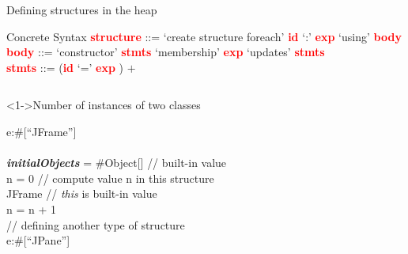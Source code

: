 \documentclass[10pt,xcolor={dvipsnames}]{beamer}
\begin{document}
	\begin{frame}{Defining structures in the heap}
		\begin{block}{Concrete Syntax}
			\hspace{1cm} \textcolor{red}{\textbf{structure}} ::= `\textcolor{Emerald}{create structure foreach}' \textcolor{red}{\textbf{id}} `\textcolor{Emerald}{:}' \textcolor{red}{\textbf{exp}} `\textcolor{Emerald}{using}' \textcolor{red}{\textbf{body}} \\ 
			\hspace{1cm} \textcolor{red}{\textbf{body}} ::= `\textcolor{Emerald}{constructor}' \textcolor{red}{\textbf{stmts}} `\textcolor{Emerald}{membership}' \textcolor{red}{\textbf{exp}} `\textcolor{Emerald}{updates}' \textcolor{red}{\textbf{stmts}} \\
			\hspace{1cm} \textcolor{red}{\textbf{stmts}} ::= (\textcolor{red}{\textbf{id}} `\textcolor{Emerald}{=}' \textcolor{red}{\textbf{exp}} ) $+$\\
		\end{block}
		\begin{columns}
			\begin{exampleblock}<1->{Number of instances of two classes}
				\begin{footnotesize}
					\hspace{.1cm}  e:\#[\textcolor{NavyBlue}{``JFrame''}]  \\
					\hspace{.3cm}  \\
					\hspace{.5cm} \textbf{\textit{initialObjects}} = \#Object[] \textcolor{Emerald}{// built-in value} \\
					\hspace{.5cm} n = 0 \textcolor{Emerald}{// compute value n in this structure} \\
					\hspace{.3cm}    JFrame \textcolor{Emerald}{// \textit{this} is built-in value} \\
					\hspace{.3cm}  n = n + 1 \\
					\vspace{0.2cm}
					\hspace{.1cm} \textcolor{Emerald}{// defining another type of structure } \\
					\hspace{.1cm}  e:\#[\textcolor{NavyBlue}{``JPane''}]  \\

\end{footnotesize}
\end{exampleblock}
\end{columns}
\end{frame}
\end{document}
